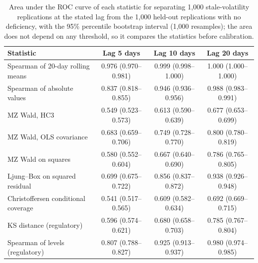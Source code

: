\begin{table}[htbp]
\centering
\footnotesize
\caption{Area under the ROC curve of each statistic for separating 1,000 stale-volatility replications at the stated lag from the 1,000 held-out replications with no deficiency, with the 95\% percentile bootstrap interval (1,000 resamples); the area does not depend on any threshold, so it compares the statistics before calibration.}
\label{tab:auc}
\begin{tabular}{lccc}
\toprule
Statistic & Lag 5 days & Lag 10 days & Lag 20 days \\
\midrule
Spearman of 20-day rolling means & 0.976 (0.970--0.981) & 0.999 (0.998--1.000) & 1.000 (1.000--1.000) \\
Spearman of absolute values & 0.837 (0.818--0.855) & 0.946 (0.936--0.956) & 0.988 (0.983--0.991) \\
MZ Wald, HC3 & 0.549 (0.523--0.573) & 0.613 (0.590--0.639) & 0.677 (0.653--0.699) \\
MZ Wald, OLS covariance & 0.683 (0.659--0.706) & 0.749 (0.728--0.770) & 0.800 (0.780--0.819) \\
MZ Wald on squares & 0.580 (0.552--0.604) & 0.667 (0.640--0.690) & 0.786 (0.765--0.805) \\
Ljung--Box on squared residual & 0.699 (0.675--0.722) & 0.856 (0.837--0.872) & 0.938 (0.926--0.948) \\
Christoffersen conditional coverage & 0.541 (0.517--0.565) & 0.609 (0.582--0.634) & 0.692 (0.669--0.715) \\
KS distance (regulatory) & 0.596 (0.574--0.621) & 0.680 (0.658--0.703) & 0.785 (0.767--0.804) \\
Spearman of levels (regulatory) & 0.807 (0.788--0.827) & 0.925 (0.913--0.937) & 0.980 (0.974--0.985) \\
\bottomrule
\end{tabular}
\end{table}
